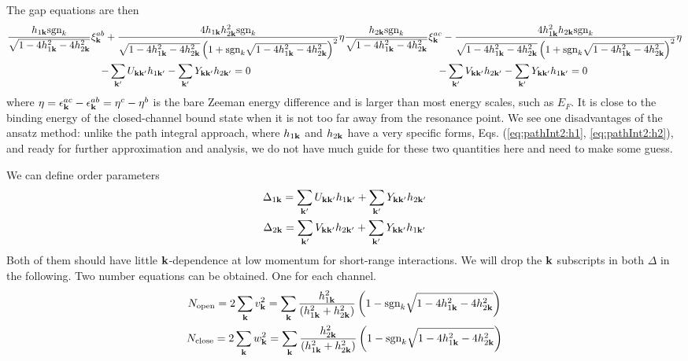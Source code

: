 The gap equations are then
\begin{subequations}\label{eq:20100909:fullgap}
\begin{multline}
\frac{h_{1\vk}\sgn_k}{\sqrt{1-4 h_{1\vk}^2-4 h_{2\vk}^2}} \xi^{ab}_{\vk}+\frac{4 h_{1\vk} h_{2\vk}^2\sgn_{k}}{\sqrt{1-4 h_{1\vk}^2-4 h_{2\vk}^2} \left(1+\sgn_{k}\sqrt{1-4 h_{1\vk}^2-4 h_{2\vk}^2}\right)^2}\eta\\
-\sum_{\vk'}U_{\vk\vk'}h_{1\vk'}-\sum_{\vk'}Y_{\vk\vk'}h_{2\vk'}=0
\label{eq:20100909:fullgapa}
\end{multline}
\begin{multline}
\frac{h_{2\vk}\sgn_k}{\sqrt{1-4 h_{1\vk}^2-4 h_{2\vk}^2}} \xi^{ac}_{\vk}-\frac{4 h_{1\vk}^{2} h_{2\vk}\sgn_{k}}{\sqrt{1-4 h_{1\vk}^2-4 h_{2\vk}^2} \left(1+\sgn_{k}\sqrt{1-4 h_{1\vk}^2-4 h_{2\vk}^2}\right)^2}\eta\\
-\sum_{\vk'}V_{\vk\vk'}h_{2\vk'}-\sum_{\vk'}Y_{\vk\vk'}h_{1\vk'}=0
\label{eq:20100909:fullgapb}
\end{multline}
\end{subequations}
where $\eta=\epsilon^{ac}_{\mathbf{k}}-\epsilon^{ab}_{\mathbf{k}}=\eta^{c}-\eta^{b}$ is the bare Zeeman energy difference and is larger than most energy scales, such as $E_{F}$.  It is close to  the binding energy of the closed-channel bound state when it is not too far away from the resonance point.   We see one  disadvantages of the ansatz method: unlike the path integral approach, where $h_{1\mathbf{k}}$ and $h_{2\mathbf{k}}$ have a very specific forms, Eqs. (\ref{eq:pathInt2:h1}, \ref{eq:pathInt2:h2}), and ready for further approximation and analysis,  we do not have much guide for these two quantities here and need to make some guess.  

We can define order parameters
\begin{gather}
\Delta_{1\mathbf{k}}=\sum_{\mathbf{k}'}U_{\mathbf{k}\mathbf{k}'}h_{1\mathbf{k}'}+\sum_{\mathbf{k}'}Y_{\mathbf{k}\mathbf{k}'}h_{2\mathbf{k}'}\\
\Delta_{2\mathbf{k}}=\sum_{\mathbf{k}'}V_{\mathbf{k}\mathbf{k}'}h_{2\mathbf{k}'}+\sum_{\mathbf{k}'}Y_{\mathbf{k}\mathbf{k}'}h_{1\mathbf{k}'}
\end{gather}
Both of them should have little $\mathbf{k}$-dependence at low momentum for short-range interactions.  We will drop the $\mathbf{k}$ subscripts in both $\Delta$ in the following. 
Two number equations can be obtained.  One for each channel.
\begin{subequations}\label{eq:20100909:number}
\begin{gather}
N_{\text{open}}=2\sum_{\mathbf{k}}v_{\mathbf{k}}^{2}
	=\sum_{\mathbf{k}}\frac{ h_{1\mathbf{k}}^2}{( h_{1\mathbf{k}}^2+ h_{2\mathbf{k}}^2)} \left(1-\text{sgn}_{k}\sqrt{1-4 h_{1\mathbf{k}}^2-4 h_{2\mathbf{k}}^2}\right)
	\label{eq:meanfield:opennum}\\
N_{\text{close}}=2\sum_{\mathbf{k}}w_{\mathbf{k}}^{2}
	=\sum_{\mathbf{k}}\frac{ h_{2\mathbf{k}}^2}{( h_{1\mathbf{k}}^2+ h_{2\mathbf{k}}^2)} \left(1-\text{sgn}_{k}\sqrt{1-4 h_{1\mathbf{k}}^2-4 h_{2\mathbf{k}}^2}\right)
\end{gather} 
\end{subequations}



